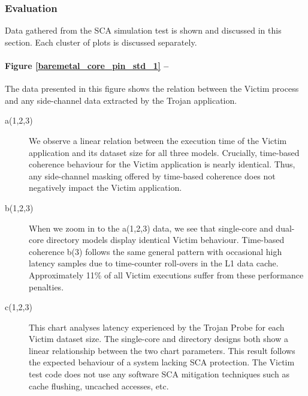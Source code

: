 			\subsubsection{Evaluation}
				Data gathered from the SCA simulation test is shown and discussed in this section. Each cluster of plots is discussed separately.
			
				\paragraph{Figure \ref{baremetal_core_pin_std_1} --}
					The data presented in this figure shows the relation between the Victim process and any side-channel data extracted by the Trojan application. 
					\begin{description}
					\item [a(1,2,3)] 
						We observe a linear relation between the execution time of the Victim application and its dataset size for all three models. Crucially, time-based coherence behaviour for the Victim application is nearly identical. Thus, any side-channel masking offered by time-based coherence does not negatively impact the Victim application.
					\item [b(1,2,3)] 
						When we zoom in to the a(1,2,3) data, we see that single-core and dual-core directory models display identical Victim behaviour. Time-based coherence b(3) follows the same general pattern with occasional high latency samples due to time-counter roll-overs in the L1 data cache. Approximately 11\% of all Victim executions suffer from these performance penalties.
					\item [c(1,2,3)] 
						This chart analyses latency experienced by the Trojan Probe for each Victim dataset size. The single-core and directory designs both show a linear relationship between the two chart parameters. This result follows the expected behaviour of a system lacking SCA protection. The Victim test code does not use any software SCA mitigation techniques such as cache flushing, uncached accesses, etc.
						

\end{description}
